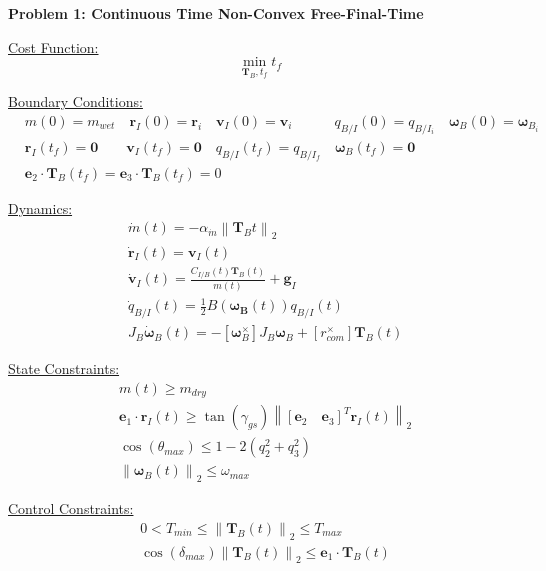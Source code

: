 \begin{mdframed}
\textbf{Problem 1: Continuous Time Non-Convex Free-Final-Time}

\underline{Cost Function:}
\begin{equation*}
\min_{\mathbf{T}_B, t_f} t_f
\end{equation*}

\underline{Boundary Conditions:}  
\begin{align*}
& m(0) = m_{wet} \quad \mathbf{r}_I(0) = \mathbf{r}_i \quad \mathbf{v}_I(0) = \mathbf{v}_i \quad \quad \quad{q}_{B/I}(0) = {q}_{B/I _{i}} \quad \bm{\omega}_B(0) = \bm{\omega}_{B _{i}} \\
& \mathbf{r}_I(t_f) = \mathbf{0} \quad \quad \mathbf{v}_I(t_f) = \mathbf{0} \quad {q}_{B/I}(t_f) = {q}_{B/I _ {f}} \quad \bm{\omega}_B(t_f) = \mathbf{0} \\
& \mathbf{e}_2 \cdot \mathbf{T}_B(t_f) = \mathbf{e}_3 \cdot \mathbf{T}_B(t_f) = 0
\end{align*}

\underline{Dynamics:}  
\begin{align*}
& \dot{m}(t) = -\alpha_{\dot{m}} \left\lVert \mathbf{T}_B{t} \right\rVert _2 \\
& \dot{\mathbf{r}}_I(t) = \mathbf{v}_I(t) \\
& \dot{\mathbf{v}}_I(t) = \frac{C_{I/B}(t)\mathbf{T}_B(t)}{m(t)} + \mathbf{g}_I \\
 & \dot{q}_{B/I}(t) = \frac{1}{2} B(\bm{\omega_B}(t)) q_{B/I}(t) \\
& J_B \dot{\bm{\omega}}_B(t) = -\left[\bm{\omega}_B ^ \times\right] J_B \bm{\omega}_B + \left[r_{com}^\times \right]\mathbf{T}_B(t)
\end{align*}

\underline{State Constraints:}  
\begin{align*}
& m(t) \geq m_{dry} \\
& \mathbf{e}_1 \cdot \mathbf{r}_I(t) \geq \tan(\gamma_{gs}) \left\lVert \left[\mathbf{e}_2 \quad \mathbf{e}_3\right]^T \mathbf{r}_I(t) \right\lVert_2 \\
& \cos(\theta_{max}) \leq 1-2(q_{2}^{2}+q_{3}^{2}) \\
& \left \lVert \bm{\omega}_B(t) \right \lVert_2 \leq \omega_{max}
\end{align*}

\underline{Control Constraints:}  
\begin{align*}
& 0 < T_{min} \leq \left \lVert \bm{T}_B(t) \right \lVert_2 \leq T_{max} \\
& \cos(\delta_{max}) \left \lVert \bm{T}_B(t) \right \lVert_2 \leq \bm{e}_1 \cdot \bm{T}_B(t)
\end{align*}

\end{mdframed}


























